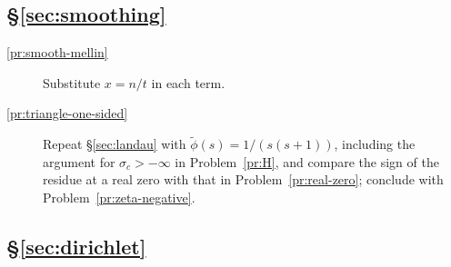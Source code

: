 \documentclass[reqno]{amsart}
\theoremstyle{definition}
\theoremstyle{plain}
\begin{document}
\subsection*{\S\ref{sec:smoothing}}
\begin{description}
\item[\ref{pr:smooth-mellin}] Substitute $x = n/t$ in each term.
\item[\ref{pr:triangle-one-sided}] Repeat \S\ref{sec:landau} with $\tilde\phi(s) = 1/(s(s+1))$, including the argument for $\sigma_c > -\infty$ in Problem~\ref{pr:H}, and compare the sign of the residue at a real zero with that in Problem~\ref{pr:real-zero}; conclude with Problem~\ref{pr:zeta-negative}.
\end{description}

\subsection*{\S\ref{sec:dirichlet}}
\end{document}
